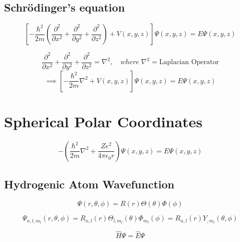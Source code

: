 \documentclass[12pt]{extarticle}
\begin{document}
\subsection{Schr\"odinger's equation}
\begin{equation}
\left[	-  \frac{\hbar^2}{2m} \left( \frac{\partial^2}{\partial x^2} + \frac{\partial^2}{\partial y^2} + \frac{\partial^2}{\partial z^2}  \right) + V(x, y, z) \right] \Psi(x, y, z) = E \Psi(x, y, z)
\end{equation}

\begin{equation}
	\frac{\partial^2}{\partial x^2} + \frac{\partial ^2}{\partial y^2} + \frac{\partial ^2}{\partial z^2} = \nabla^2, \quad where\; \nabla^2 = \textrm{Laplacian Operator}  
\end{equation}
\begin{equation}
	\implies \left[ - \frac{\hbar^2}{2m} \nabla^2 + V(x, y, z)\right] \Psi(x, y, z) = E\Psi(x, y, z)
\end{equation}

\section{Spherical Polar Coordinates}
\begin{equation}
	- \left( \frac{\hbar^2}{2m} \nabla^2 + \frac{Ze^2}{4\pi\epsilon_0 r} \right) \Psi(x, y, z) = E\Psi(x, y, z)
\end{equation}

\subsection{Hydrogenic Atom Wavefunction}
\begin{equation}
	\Psi(r, \theta, \phi) = R(r) \Theta(\theta) \Phi(\phi)
\end{equation}

\begin{equation}
	\Psi_{n, l, m_l}(r, \theta, \phi) = R_{n, l}(r)\Theta_{l, m_l}(\theta)\Phi_{m_l}(\phi) = R_{n, l}(r)Y_{, m_l}(\theta, \phi)
\end{equation}

\begin{equation}
	\hat{H}\Psi = \hat{E}\Psi
\end{equation}
\end{document}
